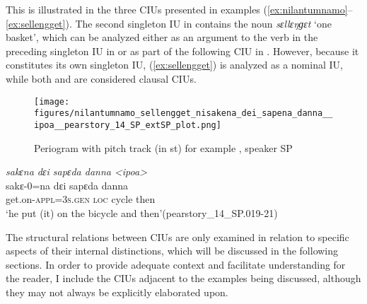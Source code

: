 This is illustrated in the three CIUs presented in examples (\ref{ex:nilantumnamo}--\ref{ex:sellengget}). The second singleton IU in  contains the noun \textit{sɛllɛŋɡɛt} ‘one basket’, which can be analyzed either as an argument to the verb in the preceding singleton IU in  or as part of the following CIU in . However, because it constitutes its own singleton IU, (\ref{ex:sellengget}) is analyzed as a nominal IU, while both  and  are considered clausal CIUs.



\begin{figure}
	\texttt{[image: figures/nilantumnamo\_sellengget\_nisakena\_dei\_sapena\_danna\_\_ipoa\_\_pearstory\_14\_SP\_extSP\_plot.png]}
	\caption{Periogram with pitch track (in st) for example , speaker SP}
	\label{pitch:nilantumnamo sellengget}
\end{figure}


\ea
\label{ex:nilantumnamo sellengget}



{
	\ex
	\label{ex:nisakena dɛi sapena danna <ipoa>}
	\textit{sakɛna dɛi sapɛda danna <ipoa>} \\
	\gll  sakɛ-0=na dɛi sapɛda danna  \\
	get.on\textsc{-appl=3s}.\textsc{gen} \textsc{loc} cycle then  \\
	\glt `he put (it) on the bicycle and then'\hfill(pearstory\_14\_SP.019-21)
}
\z
\z

The structural relations between CIUs are only examined in relation to specific aspects of their internal distinctions, which will be discussed in the following sections. In order to provide adequate context and facilitate understanding for the reader, I include the CIUs adjacent to the examples being discussed, although they may not always be explicitly elaborated upon.

